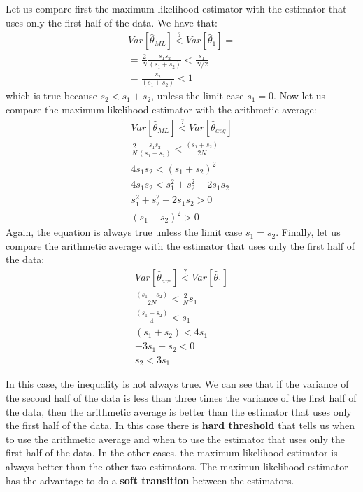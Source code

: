Let us compare first the maximum likelihood estimator with the estimator that uses only the first half of the data. We have that:
\begin{align*}
    Var[\hat \theta _{ML}]\overset ?< Var[\hat \theta_1]=         \\
    = \frac {2}{ N} \frac{{s_1}s_2}{(s_1+s_2)}<\frac{{s_1}}{ N/2} \\
    = \frac{s_2}{(s_1+s_2)}<1
\end{align*}
which is true because $s_2<s_1+s_2$, unless the limit case $s_1=0$.
Now let us compare the maximum likelihood estimator with the arithmetic average:
\begin{align*}
    Var[\hat \theta _{ML}]\overset ?< Var[\hat \theta_{avg}]     \\
    \frac 2{ N} \frac{s_1s_2}{(s_1+s_2)}< \frac {(s_1+s_2)}{2 N} \\
    4 {s_1s_2}< (s_1+s_2)^2                                      \\
    4 {s_1s_2}< s_1^2+s_2^2+2s_1s_2                              \\
    s_1^2+s_2^2-2s_1s_2>0                                        \\
    (s_1-s_2)^2>0
\end{align*}
Again, the equation is always true unless the limit case $s_1=s_2$.
Finally, let us compare the arithmetic average with the estimator that uses only the first half of the data:
\begin{align*}
    Var[\hat \theta _{ave}]\overset ?< Var[\hat \theta_{1}] \\
    \frac {(s_1+s_2)}{2 N}<\frac 2{ N}s_1                   \\
    \frac {(s_1+s_2)}{4}< s_1                               \\
    {(s_1+s_2)}< 4{s_1}                                     \\
    -3s_1+s_2<0                                             \\
    s_2<3s_1
\end{align*}

In this case, the inequality is not always true. We can see that if the variance of the second half of the data is less than three times the variance of the first half of the data, then the arithmetic average is better than the estimator that uses only the first half of the data. In this case there is \textbf{hard threshold} that tells us when to use the arithmetic average and when to use the estimator that uses only the first half of the data. In the other cases, the maximum likelihood estimator is always better than the other two estimators.
The maximun likelihood estimator has the advantage to do a \textbf{soft transition} between the estimators.

